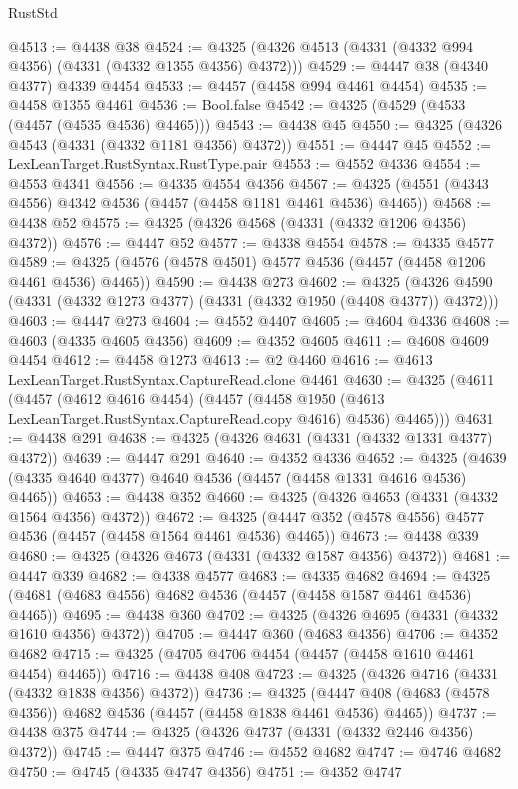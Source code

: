 \begin{lexlean}{RustStd}
\begin{coremodule}
@4513 := @4438 @38
@4524 := @4325 (@4326 @4513 (@4331 (@4332 @994 @4356) (@4331 (@4332 @1355 @4356) @4372)))
@4529 := @4447 @38 (@4340 @4377) @4339 @4454
@4533 := @4457 (@4458 @994 @4461 @4454)
@4535 := @4458 @1355 @4461
@4536 := Bool.false
@4542 := @4325 (@4529 (@4533 (@4457 (@4535 @4536) @4465)))
@4543 := @4438 @45
@4550 := @4325 (@4326 @4543 (@4331 (@4332 @1181 @4356) @4372))
@4551 := @4447 @45
@4552 := LexLeanTarget.RustSyntax.RustType.pair
@4553 := @4552 @4336
@4554 := @4553 @4341
@4556 := @4335 @4554 @4356
@4567 := @4325 (@4551 (@4343 @4556) @4342 @4536 (@4457 (@4458 @1181 @4461 @4536) @4465))
@4568 := @4438 @52
@4575 := @4325 (@4326 @4568 (@4331 (@4332 @1206 @4356) @4372))
@4576 := @4447 @52
@4577 := @4338 @4554
@4578 := @4335 @4577
@4589 := @4325 (@4576 (@4578 @4501) @4577 @4536 (@4457 (@4458 @1206 @4461 @4536) @4465))
@4590 := @4438 @273
@4602 := @4325 (@4326 @4590 (@4331 (@4332 @1273 @4377) (@4331 (@4332 @1950 (@4408 @4377)) @4372)))
@4603 := @4447 @273
@4604 := @4552 @4407
@4605 := @4604 @4336
@4608 := @4603 (@4335 @4605 @4356)
@4609 := @4352 @4605
@4611 := @4608 @4609 @4454
@4612 := @4458 @1273
@4613 := @2 @4460
@4616 := @4613 LexLeanTarget.RustSyntax.CaptureRead.clone @4461
@4630 := @4325
    (@4611
      (@4457
        (@4612 @4616 @4454)
        (@4457 (@4458 @1950 (@4613 LexLeanTarget.RustSyntax.CaptureRead.copy @4616) @4536) @4465)))
@4631 := @4438 @291
@4638 := @4325 (@4326 @4631 (@4331 (@4332 @1331 @4377) @4372))
@4639 := @4447 @291
@4640 := @4352 @4336
@4652 := @4325 (@4639 (@4335 @4640 @4377) @4640 @4536 (@4457 (@4458 @1331 @4616 @4536) @4465))
@4653 := @4438 @352
@4660 := @4325 (@4326 @4653 (@4331 (@4332 @1564 @4356) @4372))
@4672 := @4325 (@4447 @352 (@4578 @4556) @4577 @4536 (@4457 (@4458 @1564 @4461 @4536) @4465))
@4673 := @4438 @339
@4680 := @4325 (@4326 @4673 (@4331 (@4332 @1587 @4356) @4372))
@4681 := @4447 @339
@4682 := @4338 @4577
@4683 := @4335 @4682
@4694 := @4325 (@4681 (@4683 @4556) @4682 @4536 (@4457 (@4458 @1587 @4461 @4536) @4465))
@4695 := @4438 @360
@4702 := @4325 (@4326 @4695 (@4331 (@4332 @1610 @4356) @4372))
@4705 := @4447 @360 (@4683 @4356)
@4706 := @4352 @4682
@4715 := @4325 (@4705 @4706 @4454 (@4457 (@4458 @1610 @4461 @4454) @4465))
@4716 := @4438 @408
@4723 := @4325 (@4326 @4716 (@4331 (@4332 @1838 @4356) @4372))
@4736 := @4325
    (@4447 @408 (@4683 (@4578 @4356)) @4682 @4536 (@4457 (@4458 @1838 @4461 @4536) @4465))
@4737 := @4438 @375
@4744 := @4325 (@4326 @4737 (@4331 (@4332 @2446 @4356) @4372))
@4745 := @4447 @375
@4746 := @4552 @4682
@4747 := @4746 @4682
@4750 := @4745 (@4335 @4747 @4356)
@4751 := @4352 @4747

\end{coremodule}
\end{lexlean}
